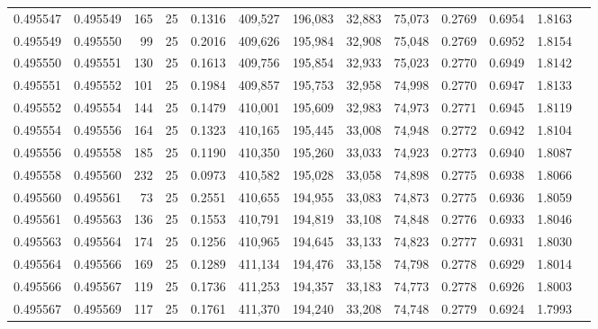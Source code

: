 \begin{tabular}{rrrrrrrrrrrrr}
0.495547 & 0.495549 &   165 &  25 &                                     0.1316 & 409,527 & 196,083 &  32,883 &  75,073 & 0.2769 & 0.6954 & 1.8163 \\
0.495549 & 0.495550 &    99 &  25 &                                     0.2016 & 409,626 & 195,984 &  32,908 &  75,048 & 0.2769 & 0.6952 & 1.8154 \\
0.495550 & 0.495551 &   130 &  25 &                                     0.1613 & 409,756 & 195,854 &  32,933 &  75,023 & 0.2770 & 0.6949 & 1.8142 \\
0.495551 & 0.495552 &   101 &  25 &                                     0.1984 & 409,857 & 195,753 &  32,958 &  74,998 & 0.2770 & 0.6947 & 1.8133 \\
0.495552 & 0.495554 &   144 &  25 &                                     0.1479 & 410,001 & 195,609 &  32,983 &  74,973 & 0.2771 & 0.6945 & 1.8119 \\
0.495554 & 0.495556 &   164 &  25 &                                     0.1323 & 410,165 & 195,445 &  33,008 &  74,948 & 0.2772 & 0.6942 & 1.8104 \\
0.495556 & 0.495558 &   185 &  25 &                                     0.1190 & 410,350 & 195,260 &  33,033 &  74,923 & 0.2773 & 0.6940 & 1.8087 \\
0.495558 & 0.495560 &   232 &  25 &                                     0.0973 & 410,582 & 195,028 &  33,058 &  74,898 & 0.2775 & 0.6938 & 1.8066 \\
0.495560 & 0.495561 &    73 &  25 &                                     0.2551 & 410,655 & 194,955 &  33,083 &  74,873 & 0.2775 & 0.6936 & 1.8059 \\
0.495561 & 0.495563 &   136 &  25 &                                     0.1553 & 410,791 & 194,819 &  33,108 &  74,848 & 0.2776 & 0.6933 & 1.8046 \\
0.495563 & 0.495564 &   174 &  25 &                                     0.1256 & 410,965 & 194,645 &  33,133 &  74,823 & 0.2777 & 0.6931 & 1.8030 \\
0.495564 & 0.495566 &   169 &  25 &                                     0.1289 & 411,134 & 194,476 &  33,158 &  74,798 & 0.2778 & 0.6929 & 1.8014 \\
0.495566 & 0.495567 &   119 &  25 &                                     0.1736 & 411,253 & 194,357 &  33,183 &  74,773 & 0.2778 & 0.6926 & 1.8003 \\
0.495567 & 0.495569 &   117 &  25 &                                     0.1761 & 411,370 & 194,240 &  33,208 &  74,748 & 0.2779 & 0.6924 & 1.7993 \\

\end{tabular}
